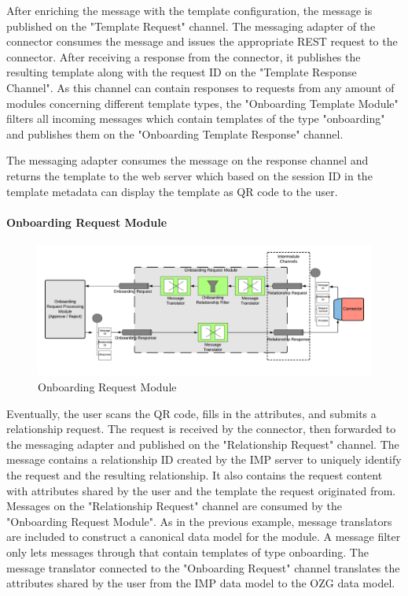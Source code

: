 After enriching the message with the template configuration, the message is published on the "Template Request" channel. The messaging adapter of the connector consumes the message and issues the appropriate REST request to the connector. After receiving a response from the connector, it publishes the resulting template along with the request ID on the "Template Response Channel". As this channel can contain responses to requests from any amount of modules concerning different template types, the "Onboarding Template Module" filters all incoming messages which contain templates of the type "onboarding" and publishes them on the "Onboarding Template Response" channel.

The messaging adapter consumes the message on the response channel and returns the template to the web server which based on the session ID in the template metadata can display the template as QR code to the user.

\paragraph{Onboarding Request Module}

\begin{figure}[h!]
    \centering
    \includegraphics[scale=0.6]{Diagrams/Integration Architecture 1/Technological Integration/7. Onboarding Request Module.pdf}
    \caption{Onboarding Request Module}
    \label{integration1:onboarding_request_module}
\end{figure}

Eventually, the user scans the QR code, fills in the attributes, and submits a relationship request. The request is received by the connector, then forwarded to the messaging adapter and published on the "Relationship Request" channel. The message contains a relationship ID created by the IMP server to uniquely identify the request and the resulting relationship. It also contains the request content with attributes shared by the user and the template the request originated from. Messages on the "Relationship Request" channel are consumed by the "Onboarding Request Module". As in the previous example, message translators are included to construct a canonical data model for the module. A message filter only lets messages through that contain templates of type onboarding. The message translator connected to the "Onboarding Request" channel translates the attributes shared by the user from the IMP data model to the OZG data model.

